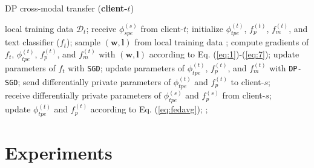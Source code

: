 \documentclass[11pt]{article}
\begin{document}
\begin{algorithm}[!htp]
\caption{DP cross-modal transfer (\textbf{client-$t$})}
\label{alg:t-side}
\small
\begin{algorithmic}[1]
    \Require local training data $\mathcal{D}_t$;
    \State receive ${\phi}_{spe}^{(s)}$ from client-$t$;
    \State  initialize ${\phi}_{tpe}^{(t)}$, ${f}_{p}^{(t)}$, ${f}_m^{(t)}$, and text classifier (${f}_t$);
            \State sample $(\mathbf{w}, \mathbf{l})$ from local training data ;
            \State compute gradients of ${f}_{t}$, ${\phi}_{tpe}^{(t)}$, ${f}_{p}^{(t)}$, and ${f}_m^{(t)}$ with $(\mathbf{w}, \mathbf{l})$ according to Eq. (\ref{eq:1})-(\ref{eq:7});
            \State  update parameters of ${f}_{t}$ with \texttt{SGD};
            \State update parameters of ${\phi}_{tpe}^{(t)}$, ${f}_{p}^{(t)}$, and ${f}_m^{(t)}$ with \texttt{DP-SGD};
        \EndFor
        \State send differentially private parameters of ${\phi}_{tpe}^{(t)}$ and ${f}_{p}^{(t)}$ to client-$s$; \\
        \State receive differentially private parameters of ${\phi}_{tpe}^{(s)}$ and ${f}_{p}^{(s)}$ from client-$s$; \\
        \State update ${\phi}_{tpe}^{(t)}$ and ${f}_{p}^{(t)}$ according to Eq. (\ref{eq:fedavg});
    \EndWhile
    ;
\end{algorithmic}
\end{algorithm} %








\section{Experiments}
\end{document}
